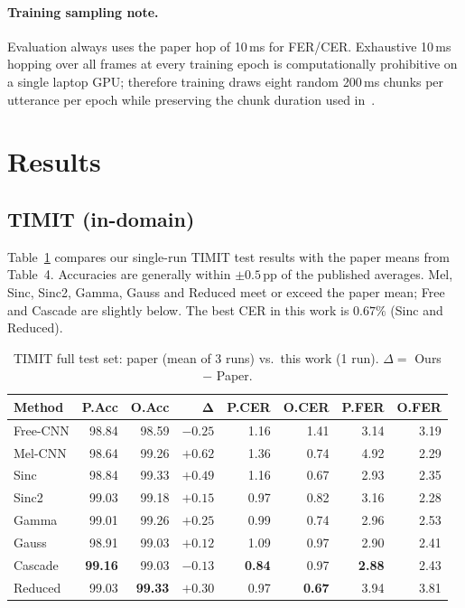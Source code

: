 \documentclass[11pt,a4paper]{article}
\begin{document}
\paragraph{Training sampling note.}
Evaluation always uses the paper hop of 10\,ms for FER/CER. Exhaustive 10\,ms hopping over all frames at every training epoch is computationally prohibitive on a single laptop GPU; therefore training draws eight random 200\,ms chunks per utterance per epoch while preserving the chunk duration used in~\cite{fayyazi2023}.

\section{Results}

\subsection{TIMIT (in-domain)}
\label{sec:timit}

Table~\ref{tab:timit} compares our single-run TIMIT test results with the paper means from Table~4. Accuracies are generally within $\pm 0.5$\,pp of the published averages. Mel, Sinc, Sinc2, Gamma, Gauss and Reduced meet or exceed the paper mean; Free and Cascade are slightly below. The best CER in this work is $0.67\%$ (Sinc and Reduced).

\begin{table}[H]
\centering
\caption{TIMIT full test set: paper (mean of 3 runs) vs.\ this work (1 run). $\Delta=$ Ours $-$ Paper.}
\label{tab:timit}
\small
\begin{tabular}{@{}lrrrrrrr@{}}
\toprule
\textbf{Method} & \textbf{P.Acc} & \textbf{O.Acc} & $\boldsymbol{\Delta}$ & \textbf{P.CER} & \textbf{O.CER} & \textbf{P.FER} & \textbf{O.FER} \\
\midrule
Free-CNN & 98.84 & 98.59 & $-0.25$ & 1.16 & 1.41 & 3.14 & 3.19 \\
Mel-CNN  & 98.64 & 99.26 & $+0.62$ & 1.36 & 0.74 & 4.92 & 2.29 \\
Sinc     & 98.84 & 99.33 & $+0.49$ & 1.16 & 0.67 & 2.93 & 2.35 \\
Sinc2    & 99.03 & 99.18 & $+0.15$ & 0.97 & 0.82 & 3.16 & 2.28 \\
Gamma    & 99.01 & 99.26 & $+0.25$ & 0.99 & 0.74 & 2.96 & 2.53 \\
Gauss    & 98.91 & 99.03 & $+0.12$ & 1.09 & 0.97 & 2.90 & 2.41 \\
Cascade  & \textbf{99.16} & 99.03 & $-0.13$ & \textbf{0.84} & 0.97 & \textbf{2.88} & 2.43 \\
Reduced  & 99.03 & \textbf{99.33} & $+0.30$ & 0.97 & \textbf{0.67} & 3.94 & 3.81 \\
\bottomrule
\end{tabular}
\end{table}
\end{document}
